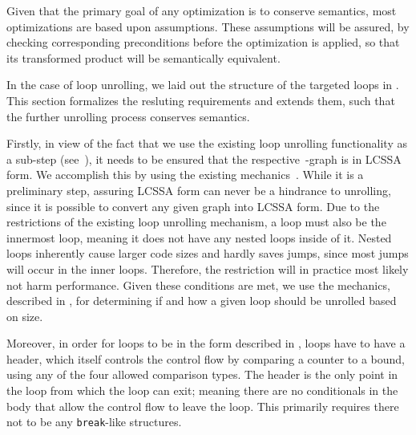 Given that the primary goal of any optimization is to conserve semantics, most optimizations are based upon assumptions.
These assumptions will be assured, by checking corresponding preconditions before the optimization is applied, so that its transformed product will be semantically equivalent.

In the case of loop unrolling, we laid out the structure of the targeted loops in .
This section formalizes the resluting requirements and extends them, such that the further unrolling process conserves semantics.

Firstly, in view of the fact that we use the existing loop unrolling functionality as a sub-step (see~), it needs to be ensured that the respective~\libFIRM-graph is in LCSSA form.
We accomplish this by using the existing mechanics~\cite{aebi18bachelorarbeit}.
While it is a preliminary step, assuring LCSSA form can never be a hindrance to unrolling, since it is possible to convert any given \libFIRM{} graph into LCSSA form.
Due to the restrictions of the existing loop unrolling mechanism, a loop must also be the innermost loop, meaning it does not have any nested loops inside of it.
Nested loops inherently cause larger code sizes and hardly saves jumps, since most jumps will occur in the inner loops.
Therefore, the restriction will in practice most likely not harm performance.
Given these conditions are met, we use the mechanics, described in , for determining if and how a given loop should be unrolled based on size.

Moreover, in order for loops to be in the form described in , loops have to have a header, which itself controls the control flow by comparing a counter to a bound, using any of the four allowed comparison types.
The header is the only point in the loop from which the loop can exit; meaning there are no conditionals in the body that allow the control flow to leave the loop.
This primarily requires there not to be any \texttt{break}-like structures.

